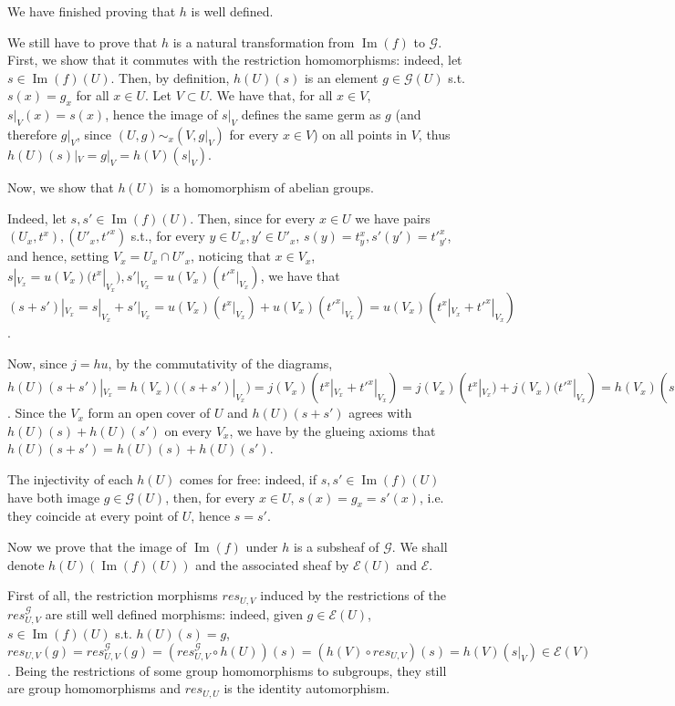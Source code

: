 \documentclass{article}
\DeclareMathOperator{\Ima}{Im}
\begin{document}
We have finished proving that $h$ is well defined.

We still have to prove that $h$ is a natural transformation from $\Ima(f)$ to $\mathcal{G}$. First, we show that it commutes with the restriction homomorphisms: indeed, let $s\in\Ima(f)(U)$. Then, by definition, $h(U)(s)$ is an element $g\in\mathcal{G}(U)$ s.t. $s(x)=g_x$ for all $x\in U$. Let $V\subset U$. We have that, for all $x\in V$, $s|_{V}(x)=s(x)$, hence the image of $s|_{V}$ defines the same germ as $g$ (and therefore $g|_V$, since $(U,g)\sim_x (V,g|_V)$ for every $x\in V$) on all points in $V$, thus $h(U)(s)|_V=g|_{V}=h(V)(s|_{V})$.

Now, we show that $h(U)$ is a homomorphism of abelian groups.

Indeed, let $s,s'\in\Ima(f)(U)$. Then, since for every $x\in U$ we have pairs $(U_x,t^x),(U'_x,t'^x)$ s.t., for every $y\in U_x,y'\in U'_x$, $s(y)=t^x_y,s'(y')=t'^x_{y'}$, and hence, setting $V_x=U_x\cap U'_x$, noticing that $x\in V_x$, $s|_{V_x}=u(V_x)(t^x|_{V_x}),s'|_{V_x}=u(V_x)(t'^x|_{V_x})$, we have that $(s+s')|_{V_x}=s|_{V_x}+s'|_{V_x}=u(V_x)(t^x|_{V_x})+u(V_x)(t'^x|_{V_x})=u(V_x)(t^x|_{V_x}+t'^x|_{V_x})$.

Now, since $j=hu$, by the commutativity of the diagrams, $h(U)(s+s')|_{V_x}=h(V_x)((s+s')|_{V_x})=j(V_x)(t^x|_{V_x}+t'^x|_{V_x})=j(V_x)(t^x|_{V_x})+j(V_x)(t'^x|_{V_x})=h(V_x)(s|_{V_x})+h(V_x)(s'|_{V_x})=h(U)(s)|_{V_x}+h(U)(s')|_{V_x}=(h(U)(s)+h(U)(s'))|_{V_x}$. Since the $V_x$ form an open cover of $U$ and $h(U)(s+s')$ agrees with $h(U)(s)+h(U)(s')$ on every $V_x$, we have by the glueing axioms that $h(U)(s+s')=h(U)(s)+h(U)(s')$.

The injectivity of each $h(U)$ comes for free: indeed, if $s,s'\in\Ima(f)(U)$ have both image $g\in\mathcal{G}(U)$, then, for every $x\in U$, $s(x)=g_x=s'(x)$, i.e. they coincide at every point of $U$, hence $s=s'$.

Now we prove that the image of $\Ima(f)$ under $h$ is a subsheaf of $\mathcal{G}$. We shall denote $h(U)(\Ima(f)(U))$ and the associated sheaf by $\mathcal{E}(U)$ and $\mathcal{E}$.

First of all, the restriction morphisms $res_{U,V}$ induced by the restrictions of the $res^{\mathcal{G}}_{U,V}$ are still well defined morphisms: indeed, given $g\in\mathcal{E}(U)$, $s\in\Ima(f)(U)$ s.t. $h(U)(s)=g$, $res_{U,V}(g)=res^{\mathcal{G}}_{U,V}(g)=(res^{\mathcal{G}}_{U,V}\circ h(U))(s)=(h(V)\circ res_{U,V})(s)=h(V)(s|_V)\in \mathcal{E}(V)$. Being the restrictions of some group homomorphisms to subgroups, they still are group homomorphisms and $res_{U,U}$ is the identity automorphism.
\end{document}
